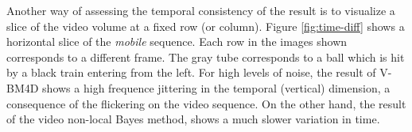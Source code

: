 \documentclass[10pt, journal, twocolumn, final, a4paper]{IEEEtran}
\newcommand{\bsic}[1]{\textcolor{black}{\textit{#1}}}
\newcommand{\Bsic}[1]{\textcolor{black}{\textbf{\textit{#1}}}}
\newcommand{\Best}[1]{\textbf{\textcolor{black}{#1}}}
\begin{document}
Another way of assessing the temporal consistency of the result is to visualize a 
slice of the video volume at a fixed row (or column). Figure \ref{fig:time-diff} shows
a horizontal slice of the \emph{mobile} sequence. Each row in the images shown corresponds
to a different frame. The gray tube corresponds to a ball which is hit by a
black train entering from the left. For high levels of noise, the result of V-BM4D
shows a high frequence jittering in the temporal (vertical) dimension, a consequence
of the flickering on the video sequence. On the other hand, the result of the
video non-local Bayes method, shows a much slower variation in time.


\begin{table}[htp!]
	\begin{center}
		{%
		\renewcommand{\tabcolsep}{1.6mm}
		\renewcommand{\arraystretch}{1.3}
}
\end{center}
\end{table}
\end{document}
